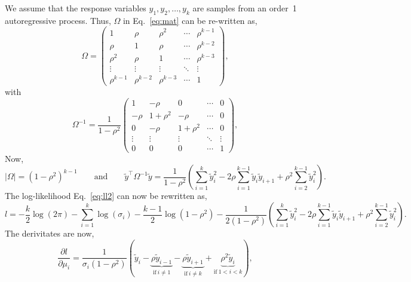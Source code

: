 \documentclass{article}
\begin{document}
We assume that the response variables $y_1, y_2, \dots, y_k$ are samples from an order~1 autoregressive process. Thus, $\Omega$ in Eq.~\ref{eq:mat} can be re-written as,
%
\begin{equation}
 \Omega=
  \begin{pmatrix}
   1 & \rho & \rho^2 & \cdots & \rho^{k-1} \\
   \rho & 1 & \rho & \cdots & \rho^{k-2} \\
   \rho^2 & \rho & 1 & \cdots & \rho^{k-3} \\
   \vdots & \vdots & \vdots & \ddots & \vdots \\
   \rho^{k-1} & \rho^{k-2} & \rho^{k-3} & \cdots & 1
  \end{pmatrix},
\end{equation}
%
with
\begin{equation}
 \Omega^{-1}= \frac{1}{1-\rho^2}
  \begin{pmatrix}
   1 & -\rho & 0 & \cdots & 0 \\
   -\rho & 1+\rho^2 & -\rho & \cdots & 0 \\
   0 & -\rho & 1+\rho^2 & \cdots & 0 \\
   \vdots & \vdots & \vdots & \ddots & \vdots \\
   0 & 0 & 0 & \cdots & 1
  \end{pmatrix},
\end{equation}
%
Now,
\begin{equation}
  |\Omega| = (1-\rho^2)^{k-1}
  \qquad \text{and} \qquad
  \tilde{y}^\top \Omega^{-1} \tilde{y} = \frac{1}{1-\rho^2} \left( \sum_{i=1}^{k} \tilde{y}_i^2 - 2\rho \sum_{i=1}^{k-1} \tilde{y}_i \tilde{y}_{i+1} + \rho^2 \sum_{i=2}^{k-1} \tilde{y}_i^2 \right).
\end{equation}
%
The log-likelihood Eq.~\ref{eq:ll2} can now be rewritten as,
%
\begin{equation}
 l = -\frac{k}{2}\log(2\pi) - \sum_{i=1}^{k} \log(\sigma_i) - \frac{k-1}{2}\log(1-\rho^2) - \frac{1}{2(1-\rho^2)} \left( \sum_{i=1}^{k} \tilde{y}_i^2 - 2 \rho \sum_{i=1}^{k-1} \tilde{y}_i \tilde{y}_{i+1} + \rho^2 \sum_{i=2}^{k-1} \tilde{y}_i^2 \right).
 \label{eq:llAR}
\end{equation}
%
The derivitates are now,
%
\begin{equation}
  \frac{\partial l}{\partial \mu_i} = \frac{1}{\sigma_i(1-\rho^2)}
  \left( \tilde{y}_i
         - \underbrace{\rho\tilde{y}_{i-1}}_{\text{if} \: i \neq 1}
         - \underbrace{\rho\tilde{y}_{i+1}}_{\text{if} \: i \neq k}
         + \underbrace{\rho^2\tilde{y}_i}_{\text{if} \: 1 < i < k}
  \right),
\end{equation}
\end{document}
